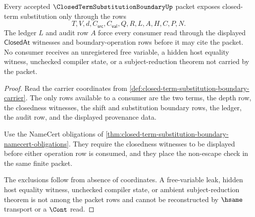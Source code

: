 \begin{theorem}
\label{thm:closed-term-substitution-boundary-ledger-non-escape}
Every accepted $\ClosedTermSubstitutionBoundaryUp$ packet exposes closed-term substitution only through the rows
$$
T,V,d,C_{\mathsf{src}},C_{\mathsf{val}},Q,R,L,A,H,C,P,N.
$$
The ledger $L$ and audit row $A$ force every consumer read through the displayed $\mathsf{ClosedAt}$ witnesses and boundary-operation rows before it may cite the packet. No consumer receives an unregistered free variable, a hidden host equality witness, unchecked compiler state, or a subject-reduction theorem not carried by the packet.
\end{theorem}
\begin{proof}
Read the carrier coordinates from \autoref{def:closed-term-substitution-boundary-carrier}. The only rows available to a consumer are the two terms, the depth row, the closedness witnesses, the shift and substitution boundary rows, the ledger, the audit row, and the displayed provenance data.

Use the NameCert obligations of \autoref{thm:closed-term-substitution-boundary-namecert-obligations}. They require the closedness witnesses to be displayed before either operation row is consumed, and they place the non-escape check in the same finite packet.

The exclusions follow from absence of coordinates. A free-variable leak, hidden host equality witness, unchecked compiler state, or ambient subject-reduction theorem is not among the packet rows and cannot be reconstructed by $\hsame$ transport or a $\Cont$ read.
\end{proof}

